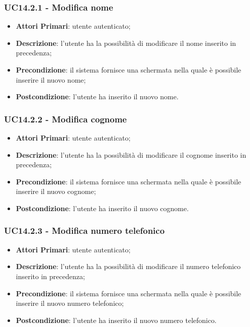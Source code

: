 \subsubsection{UC14.2.1 - Modifica nome}
\begin{itemize}
	\item \textbf{Attori Primari}: utente autenticato;
	\item \textbf{Descrizione}: l'utente ha la possibilità di modificare il nome inserito in precedenza;
	\item \textbf{Precondizione}: il sistema fornisce una schermata nella quale è possibile inserire il nuovo nome;
	\item \textbf{Postcondizione}: l'utente ha inserito il nuovo nome.
\end{itemize}

\subsubsection{UC14.2.2 - Modifica cognome}
\begin{itemize}
	\item \textbf{Attori Primari}: utente autenticato;
	\item \textbf{Descrizione}: l'utente ha la possibilità di modificare il cognome inserito in precedenza;
	\item \textbf{Precondizione}: il sistema fornisce una schermata nella quale è possibile inserire il nuovo cognome;
	\item \textbf{Postcondizione}: l'utente ha inserito il nuovo cognome.
\end{itemize}

\subsubsection{UC14.2.3 - Modifica numero telefonico}
\begin{itemize}
	\item \textbf{Attori Primari}: utente autenticato;
	\item \textbf{Descrizione}: l'utente ha la possibilità di modificare il numero telefonico inserito in precedenza;
	\item \textbf{Precondizione}: il sistema fornisce una schermata nella quale è possibile inserire il nuovo numero telefonico;
	\item \textbf{Postcondizione}: l'utente ha inserito il nuovo numero telefonico.
\end{itemize}

